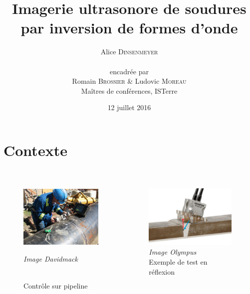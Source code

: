 \documentclass[10pt,xcolor=x11names,compress, notes=show]{beamer}%
\author{Alice \textsc{Dinsenmeyer} \\~\\ encadrée par\\ Romain \textsc{Brossier} \& Ludovic \textsc{Moreau} \\ Maîtres de conférences, ISTerre}
\title{Imagerie ultrasonore de soudures\\par inversion de formes d'onde}
\subtitle{}
\date{\small 12 juillet 2016}
\begin{document}
\begin{frame}
	\titlepage 
\end{frame}


\section{Contexte}

\subsection*{}
\begin{frame}{\insertsectionhead}
\vspace{-0.2cm}
		\begin{columns}
			\centering
			\begin{figure}
				\includegraphics[height=3cm]{img/us_test.jpg}\\
				{\tiny{\raggedright \itshape Image Davidmack}\\ \centering \scriptsize{Contrôle sur pipeline}}
			\end{figure}		
			\begin{figure}
				\includegraphics[height=3cm]{img/olympus.jpg}\\
				 {\tiny{\itshape Image Olympus}\\ \centering			\scriptsize{Exemple de test en réflexion}}
			\end{figure}
		\end{columns}	
		\vspace{0.4cm}	


\end{frame}
\end{document}

